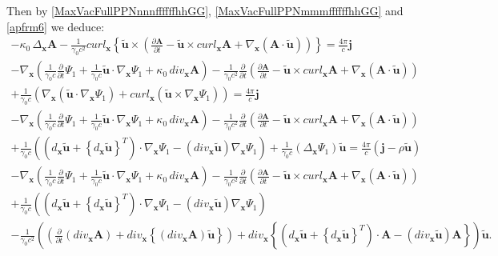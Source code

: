 \documentclass{article}
\theoremstyle{definition}
\theoremstyle{remark}
\renewcommand{\vec}[1]{\mathbf{#1}}
\newcommand{\er}{\eqref}
\newcommand{\er}{\eqref}
\begin{document}
Then by \er{MaxVacFullPPNnnnffffffhhGG},
\er{MaxVacFullPPNmmmffffffhhGG} and \er{apfrm6} we deduce:
\begin{multline}\label{MaxVacFullPPNnnnffffffyuughhhGG}
-\kappa_0\,\Delta_{\vec x}\vec A-\frac{1}{\gamma_0 c^2}curl_{\vec x}
\left\{\vec {\tilde u}\times
\left(\frac{\partial\vec A}{\partial t}-\vec {\tilde u}\times
curl_{\vec x}\vec A+\nabla_{\vec x}\left(\vec A\cdot\vec {\tilde
u}\right)\right)\right\}=\frac{4\pi}{c}\vec j\\-\nabla_{\vec
x}\left(\frac{1}{\gamma_0 c}\frac{\partial}{\partial
t}\Psi_1+\frac{1}{\gamma_0 c}\vec {\tilde u}\cdot\nabla_{\vec
x}\Psi_1+\kappa_0\,div_{\vec x} \vec A\right)-\frac{1}{\gamma_0
c^2}\frac{\partial}{\partial t}\left(\frac{\partial\vec A}{\partial
t}-\vec {\tilde u}\times curl_{\vec x}\vec A+\nabla_{\vec
x}\left(\vec A\cdot\vec {\tilde u}\right)\right)\\+\frac{1}{\gamma_0
c}\left(\nabla_{\vec x}\left(\vec {\tilde u}\cdot\nabla_{\vec
x}\Psi_1\right)+curl_{\vec x} \left(\vec {\tilde u}\times
\nabla_{\vec x}\Psi_1\right)\right) =\frac{4\pi}{c}\vec
j\\-\nabla_{\vec x}\left(\frac{1}{\gamma_0
c}\frac{\partial}{\partial t}\Psi_1+\frac{1}{\gamma_0 c}\vec {\tilde
u}\cdot\nabla_{\vec x}\Psi_1+\kappa_0\,div_{\vec x} \vec
A\right)-\frac{1}{\gamma_0 c^2}\frac{\partial}{\partial
t}\left(\frac{\partial\vec A}{\partial t}-\vec {\tilde u}\times
curl_{\vec x}\vec A+\nabla_{\vec x}\left(\vec A\cdot\vec {\tilde
u}\right)\right)\\+\frac{1}{\gamma_0 c}\left(\left(d_{\vec x}\vec
{\tilde u}+\left\{d_{\vec x}\vec {\tilde u}\right\}^T\right)\cdot
\nabla_{\vec x}\Psi_1-\left(div_{\vec x}\vec {\tilde
u}\right)\nabla_{\vec x}\Psi_1\right)+\frac{1}{\gamma_0
c}\left(\Delta_{\vec x}\Psi_1\right)\vec {\tilde
u}=\frac{4\pi}{c}\left(\vec j-\rho\vec {\tilde
u}\right)\\-\nabla_{\vec x}\left(\frac{1}{\gamma_0
c}\frac{\partial}{\partial t}\Psi_1+\frac{1}{\gamma_0 c}\vec {\tilde
u}\cdot\nabla_{\vec x}\Psi_1+\kappa_0\,div_{\vec x} \vec A\right)
-\frac{1}{\gamma_0 c^2}\frac{\partial}{\partial
t}\left(\frac{\partial\vec A}{\partial t}-\vec {\tilde u}\times
curl_{\vec x}\vec A+\nabla_{\vec x}\left(\vec A\cdot\vec {\tilde
u}\right)\right)\\+\frac{1}{\gamma_0 c}\left(\left(d_{\vec x}\vec
{\tilde u}+\left\{d_{\vec x}\vec {\tilde u}\right\}^T\right)\cdot
\nabla_{\vec x}\Psi_1-\left(div_{\vec x}\vec {\tilde
u}\right)\nabla_{\vec x}\Psi_1\right)\\-\frac{1}{\gamma_0
c^2}\left(\left(\frac{\partial}{\partial t}\left(div_{\vec x}\vec
A\right)+div_{\vec x} \left\{\left(div_{\vec x}\vec A\right)\vec
{\tilde u}\right\}\right)+div_{\vec x} \left\{\left(d_{\vec x}\vec
{\tilde u}+\left\{d_{\vec x}\vec {\tilde
u}\right\}^T\right)\cdot\vec A-\left(div_{\vec x}\vec {\tilde
u}\right)\vec A\right\}\right)\vec {\tilde u}.
\end{multline}
\end{document}
